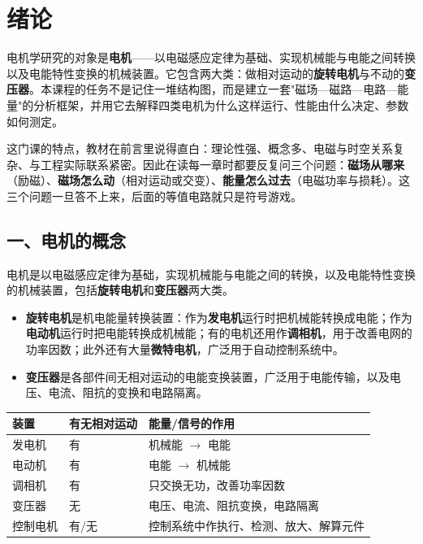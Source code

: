 \chapter*{绪论}

电机学研究的对象是\textbf{电机}——以电磁感应定律为基础、实现机械能与电能之间转换以及电能特性变换的机械装置。它包含两大类：做相对运动的\textbf{旋转电机}与不动的\textbf{变压器}。本课程的任务不是记住一堆结构图，而是建立一套"磁场—磁路—电路—能量"的分析框架，并用它去解释四类电机为什么这样运行、性能由什么决定、参数如何测定。

这门课的特点，教材在前言里说得直白：理论性强、概念多、电磁与时空关系复杂、与工程实际联系紧密。因此在读每一章时都要反复问三个问题：\textbf{磁场从哪来}（励磁）、\textbf{磁场怎么动}（相对运动或交变）、\textbf{能量怎么过去}（电磁功率与损耗）。这三个问题一旦答不上来，后面的等值电路就只是符号游戏。

\section*{一、电机的概念}

电机是以电磁感应定律为基础，实现机械能与电能之间的转换，以及电能特性变换的机械装置，包括\textbf{旋转电机}和\textbf{变压器}两大类。

\begin{itemize}
  \item \textbf{旋转电机}是机电能量转换装置：作为\textbf{发电机}运行时把机械能转换成电能；作为\textbf{电动机}运行时把电能转换成机械能；有的电机还用作\textbf{调相机}，用于改善电网的功率因数；此外还有大量\textbf{微特电机}，广泛用于自动控制系统中。
  \item \textbf{变压器}是各部件间无相对运动的电能变换装置，广泛用于电能传输，以及电压、电流、阻抗的变换和电路隔离。
\end{itemize}

\begin{center}
\begin{tabular}{@{}lll@{}}
\toprule
装置 & 有无相对运动 & 能量/信号的作用 \\
\midrule
发电机 & 有 & 机械能 $\rightarrow$ 电能 \\
电动机 & 有 & 电能 $\rightarrow$ 机械能 \\
调相机 & 有 & 只交换无功，改善功率因数 \\
变压器 & 无 & 电压、电流、阻抗变换，电路隔离 \\
控制电机 & 有/无 & 控制系统中作执行、检测、放大、解算元件 \\
\bottomrule
\end{tabular}
\end{center}

